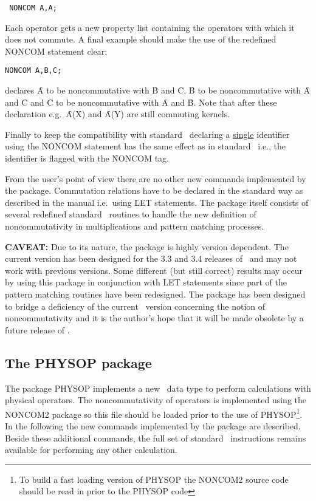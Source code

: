 \begin{verbatim}
 NONCOM A,A;
\end{verbatim}
Each operator gets a new property list containing the
operators with which it does not commute.
A final example should make
the use of the redefined \f{NONCOM} statement clear: 

\begin{verbatim}
NONCOM A,B,C;
\end{verbatim}
declares \f{A}  to be noncommutative with \f{B} and \f{C},
\f{B} to be noncommutative
with \f{A} and \f{C} and \f{C} to be noncommutative
with \f{A} and \f{B}.
Note that after these declaration
e.g.\ \f{A(X)} and \f{A(Y)}
are still commuting kernels.

Finally to keep the compatibility with standard \REDUCE\, declaring a
\underline{single} identifier using the \f{NONCOM} statement has the same
effect as in
standard \REDUCE\, i.e., the identifier is flagged with the \f{NONCOM} tag.

From the user's point of view there are no other
new commands implemented by the package. Commutation
relations have to be declared in the standard way as described in
the manual i.e.\ using
\f{LET} statements. The package itself consists of several redefined
standard
\REDUCE\ routines to handle the new definition of noncommutativity in
multiplications and pattern matching processes.

{\bf CAVEAT: } Due to its nature, the package is highly version
dependent. The current version has been designed for the 3.3  and 3.4
releases
of \REDUCE\ and may not work with previous versions. Some different
(but still correct) results may occur by using this package in
conjunction with
LET statements since part of the pattern matching routines have been
redesigned. The package has been designed to bridge a deficiency of the
current \REDUCE\ version concerning the notion of noncommutativity
 and it is the author's hope that it will be made  obsolete
by a future release of \REDUCE.

\subsection{The PHYSOP package}

The package PHYSOP implements a new \REDUCE\ data type to perform
calculations with physical operators. The noncommutativity of
operators is
implemented using the NONCOM2 package so this file should be loaded
prior to the use of PHYSOP\footnote{To build a fast
loading version of PHYSOP the NONCOM2
source code should be read in prior to the PHYSOP
code}.
In the following the new commands  implemented by the package
are described.  Beside these additional commands,
the full set of standard \REDUCE\ instructions remains
available for performing  any other calculation.

